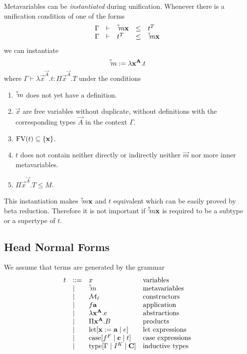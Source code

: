 Metavariables can be \emph{instantiated} during unification. Whenever there is a
unification condition of one of the forms
$$
\begin{array}{lllll}
    \Gamma &\vdash &{{}^? \kern-0.2em m} {\mathbf x} &\le &t^T
    \\
    \Gamma &\vdash &t^T &\le &{{}^? \kern-0.2em m} {\mathbf x}
\end{array}
$$
we can instantiate
$$
    {{}^? \kern-0.2em m} := \lambda {\mathbf x} ^{{\mathbf A}}. t
$$
where $\Gamma \vdash \lambda \vec x^{\vec A}. t : \Pi \vec x^{\vec A}. T$ under
the conditions
\begin{enumerate}

    \item ${{}^? \kern-0.2em m}$ does not yet have a definition.

    \item $\vec x$ are free variables without duplicate, without definitions
        with the corresponding types $\vec A$ in the context $\Gamma$.

    \item $\text{FV}(t) \subseteq {\{{\mathbf x}\}}$.

    \item $t$ does not contain neither directly or indirectly neither $\vec m$
        nor more inner metavariables.

    \item $\Pi \vec x^{\vec A}. T \le M$.
\end{enumerate}

This instantiation makes ${{}^? \kern-0.2em m} {\mathbf x}$ and $t$ equivalent which can be easily
proved by beta reduction. Therefore it is not important if
${{}^? \kern-0.2em m} {\mathbf x}$ is required to be a subtype or a supertype of $t$.





\subsection{Head Normal Forms}

We assume that terms are generated by the grammar
$$
\begin{array}{llll}
    t
    &::=& x & \text{variables}
    \\
    &\mid&
    {{}^? \kern-0.2em m}
    &\text{metavariables}
    \\
    &\mid&
    {\cal M}_\ell
    &\text{constructors}
    \\
    &\mid&
    f {\mathbf a}
    & \text{application}
    \\
    &\mid&
    \lambda {\mathbf x}^{{\mathbf A}}. e
    & \text{abstractions}
    \\
    &\mid&
    \Pi {\mathbf x}^{{\mathbf A}}. B
    & \text{products}
    \\
    &\mid&
    {\text{let}}[{\mathbf x} := {\mathbf a} \mid e]
    & \text{let expressions}
    \\
    &\mid&
    {\text{case}}[f^F \mid {\mathbf c} \mid t]
    & \text{case expressions}
    \\
    &\mid&
    {\text{type}}[\Gamma \mid I^K \mid {\mathbf C}]
    & \text{inductive types}
\end{array}
$$

